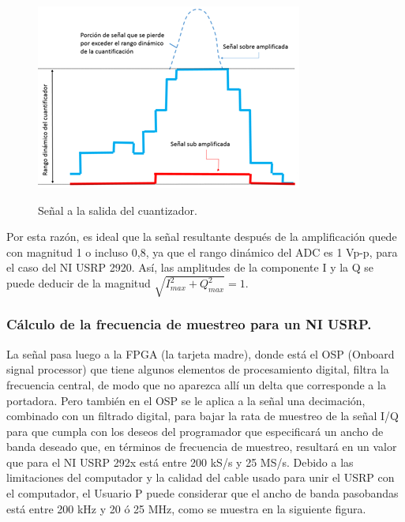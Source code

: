 \begin{figure}[h!]
	\captionsetup{justification = raggedright, singlelinecheck = false}
	\caption{Señal a la salida del cuantizador.} 
	\centering
	\includegraphics[scale=1]{Imagenes/Senal-salida.png}
	\label{fig:Senal-salida}
\end{figure}

Por esta razón, es ideal que la señal resultante después de la amplificación quede con magnitud 1 o incluso 0,8, ya que el rango dinámico del ADC es 1 Vp-p, para el caso del NI USRP 2920. Así, las amplitudes de la componente I y la Q se puede deducir de la magnitud $\sqrt{I_{max}^{2} + Q_{max}^{2}} = 1$.\\

\subsubsection{Cálculo de la frecuencia de muestreo para un NI USRP.}

La señal pasa luego a la FPGA (la tarjeta madre), donde está el OSP (Onboard signal processor) que tiene algunos elementos de procesamiento digital, filtra la frecuencia central, de modo que no aparezca allí un delta que corresponde a la portadora. Pero también en el OSP se le aplica a la señal una decimación, combinado con un filtrado digital, para bajar la rata de muestreo de la señal I/Q para que cumpla con los deseos del programador que especificará un ancho de banda deseado que, en términos de frecuencia de muestreo, resultará en un valor que para el NI USRP 292x está entre 200 kS/s y 25 MS/s. Debido a las limitaciones del computador y la calidad del cable usado para unir el USRP con el computador, el Usuario P puede considerar que el ancho de banda pasobandas está entre 200 kHz y 20 ó 25 MHz, como se muestra en la siguiente figura. \\


